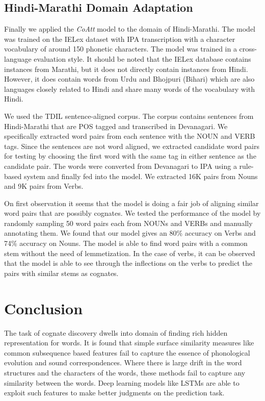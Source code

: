 \documentclass[11pt,letterpaper]{article}
\begin{document}
\subsection{Hindi-Marathi Domain Adaptation}

Finally we applied the \textit{CoAtt} model to the domain of Hindi-Marathi. The model was trained on the IELex dataset with IPA transcription with a character vocabulary of around 150 phonetic characters. The model was trained in a cross-language evaluation style. It should be noted that the IELex database contains instances from Marathi, but it does not directly contain instances from Hindi. However, it does contain words from Urdu and Bhojpuri (Bihari) which are also languages closely related to Hindi and share many words of the vocabulary with Hindi.

We used the TDIL sentence-aligned corpus. The corpus contains sentences from Hindi-Marathi that are POS tagged and transcribed in Devanagari. We specifically extracted word pairs from each sentence with the NOUN and VERB tags. Since the sentences are not word aligned, we extracted candidate word pairs for testing by choosing the first word with the same tag in either sentence as the candidate pair. The words were converted from Devanagari to IPA using a rule-based system and finally fed into the model. We extracted 16K pairs from Nouns and 9K pairs from Verbs.

On first observation it seems that the model is doing a fair job of aligning similar word pairs that are possibly cognates. We tested the performance of the model by randomly sampling 50 word pairs each from NOUNs and VERBs and manually annotating them. We found that our model gives an 80\% accuracy on Verbs and 74\% accuracy on Nouns. The model is able to find word pairs with a common stem without the need of lemmetization. In the case of verbs, it can be observed that the model is able to see through the inflections on the verbs to predict the pairs with similar stems as cognates. 

\section{Conclusion}

The task of cognate discovery dwells into domain of finding rich hidden representation for words. It is found that simple surface similarity measures like common subsequence based features fail to capture the essence of phonological evolution and sound correspondences. Where there is large drift in the word structures and the characters of the words, these methods fail to capture any similarity between the words. Deep learning models like LSTMs are able to exploit such features to make better judgments on the prediction task. 
\end{document}

